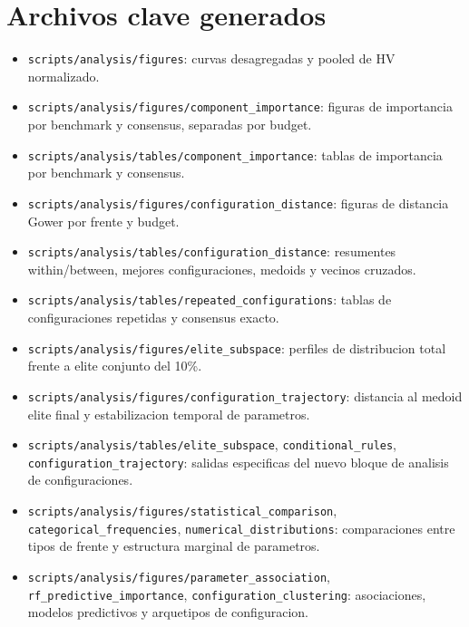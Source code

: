 \documentclass[11pt,a4paper]{article}
\begin{document}
\section{Archivos clave generados}

\begin{itemize}

\item \texttt{scripts/analysis/figures}: curvas desagregadas y pooled de HV normalizado.

\item \texttt{scripts/analysis/figures/component\_importance}: figuras de importancia por benchmark y consensus, separadas por budget.

\item \texttt{scripts/analysis/tables/component\_importance}: tablas de importancia por benchmark y consensus.

\item \texttt{scripts/analysis/figures/configuration\_distance}: figuras de distancia Gower por frente y budget.

\item \texttt{scripts/analysis/tables/configuration\_distance}: resumentes within/between, mejores configuraciones, medoids y vecinos cruzados.

\item \texttt{scripts/analysis/tables/repeated\_configurations}: tablas de configuraciones repetidas y consensus exacto.

\item \texttt{scripts/analysis/figures/elite\_subspace}: perfiles de distribucion total frente a elite conjunto del 10\%.

\item \texttt{scripts/analysis/figures/configuration\_trajectory}: distancia al medoid elite final y estabilizacion temporal de parametros.

\item \texttt{scripts/analysis/tables/elite\_subspace}, \texttt{conditional\_rules}, \texttt{configuration\_trajectory}: salidas especificas del nuevo bloque de analisis de configuraciones.

\item \texttt{scripts/analysis/figures/statistical\_comparison}, \texttt{categorical\_frequencies}, \texttt{numerical\_distributions}: comparaciones entre tipos de frente y estructura marginal de parametros.

\item \texttt{scripts/analysis/figures/parameter\_association}, \texttt{rf\_predictive\_importance}, \texttt{configuration\_clustering}: asociaciones, modelos predictivos y arquetipos de configuracion.


\end{itemize}
\end{document}
